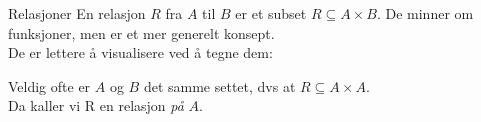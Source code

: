 \begin{frame}[fragile]{Relasjoner}
    En relasjon $R$ fra $A$ til $B$ er et subset $ R \subseteq A \times B$. De minner om funksjoner, men er et mer generelt konsept.\\
    
    \pause
    De er lettere å visualisere ved å tegne dem:
    \begin{figure}
        \centering
        \pause
        \qquad
        \pause
        \qquad
        \label{fig:relasjoner}
    \end{figure} 

    Veldig ofte er $A$ og $B$ det samme settet, dvs at $R \subseteq A \times A$.\\ 
    Da kaller vi R en relasjon \emph{på} $A$.
\end{frame}

